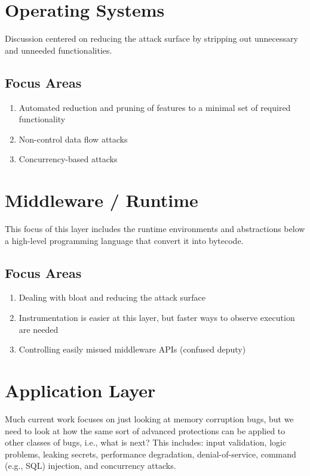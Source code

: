 \documentclass[11pt]{article}
\begin{document}
\section{Operating Systems}

Discussion centered on reducing the attack surface by stripping out
unnecessary and unneeded functionalities.

\subsection{Focus Areas}

\begin{enumerate}
	\item Automated reduction and pruning of features to a minimal set
	of required functionality
	\item Non-control data flow attacks
	\item Concurrency-based attacks
\end{enumerate}

\section{Middleware / Runtime}

This focus of this layer includes the runtime environments and abstractions
below a high-level programming language that convert it into bytecode.

\subsection{Focus Areas}

\begin{enumerate}
	\item Dealing with bloat and reducing the attack surface
	\item Instrumentation is easier at this layer, but faster ways to observe execution are needed
	\item Controlling easily misued middleware APIs (confused deputy)
\end{enumerate}

\section{Application Layer}

Much current work focuses on just looking at memory corruption bugs, but
we need to look at how the same sort of advanced protections can be
applied to other classes of bugs, i.e., what is next?  This includes:
input validation, logic problems, leaking secrets, performance degradation,
denial-of-service, command (e.g., SQL) injection, and concurrency attacks.
\end{document}
